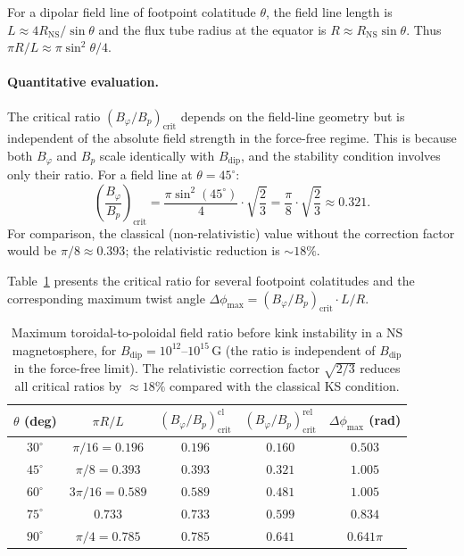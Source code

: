 For a dipolar field line of footpoint colatitude $\theta$, the
field line length is $L \approx 4R_{\mathrm{NS}}/\sin\theta$
and the flux tube radius at the equator is $R \approx R_{\mathrm{NS}}\sin\theta$.
Thus $\pi R/L \approx \pi\sin^{2}\theta/4$.

\paragraph{Quantitative evaluation.}
The critical ratio $(B_{\varphi}/B_{p})_{\mathrm{crit}}$
depends on the field-line geometry but is independent of the
absolute field strength in the force-free regime.  This is
because both $B_{\varphi}$ and $B_{p}$ scale identically with
$B_{\mathrm{dip}}$, and the stability condition involves only
their ratio.  For a field line at $\theta = 45^{\circ}$:
\begin{equation}
\left(\frac{B_{\varphi}}{B_{p}}\right)_{\mathrm{crit}}
  = \frac{\pi\sin^{2}(45^{\circ})}{4}\cdot\sqrt{\frac{2}{3}}
  = \frac{\pi}{8}\cdot\sqrt{\frac{2}{3}}
  \approx 0.321.
\label{eq:rel9-KS-NS-num}
\end{equation}
For comparison, the classical (non-relativistic) value without
the correction factor would be $\pi/8 \approx 0.393$; the
relativistic reduction is $\sim 18\%$.

Table~\ref{tab:rel-KS-NS} presents the critical ratio for
several footpoint colatitudes and the corresponding maximum
twist angle $\Delta\phi_{\mathrm{max}} = (B_{\varphi}/B_{p})_{\mathrm{crit}}\cdot L/R$.

\begin{table}[htbp]
\centering
\caption{Maximum toroidal-to-poloidal field ratio before kink
instability in a NS magnetosphere, for
$B_{\mathrm{dip}} = 10^{12}$--$10^{15}$\,G (the ratio is
independent of $B_{\mathrm{dip}}$ in the force-free limit).
The relativistic correction factor $\sqrt{2/3}$ reduces all
critical ratios by $\approx 18\%$ compared with the classical
KS condition.}
\label{tab:rel-KS-NS}
\begin{tabular}{ccccc}
\hline
$\theta$ (deg) & $\pi R/L$ &
  $(B_{\varphi}/B_{p})_{\mathrm{crit}}^{\mathrm{cl}}$ &
  $(B_{\varphi}/B_{p})_{\mathrm{crit}}^{\mathrm{rel}}$ &
  $\Delta\phi_{\mathrm{max}}$ (rad)\\
\hline
$30^{\circ}$ & $\pi/16 = 0.196$ & $0.196$ & $0.160$ & $0.503$ \\
$45^{\circ}$ & $\pi/8 = 0.393$ & $0.393$ & $0.321$ & $1.005$ \\
$60^{\circ}$ & $3\pi/16 = 0.589$ & $0.589$ & $0.481$ & $1.005$ \\
$75^{\circ}$ & $0.733$ & $0.733$ & $0.599$ & $0.834$ \\
$90^{\circ}$ & $\pi/4 = 0.785$ & $0.785$ & $0.641$ & $0.641\pi$ \\
\hline
\end{tabular}
\end{table}

